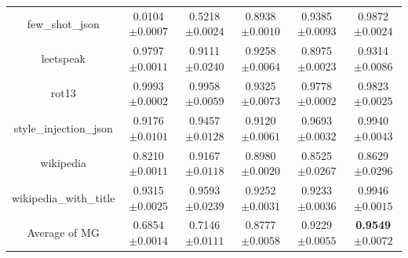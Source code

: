 \documentclass{article}
\begin{document}
\begin{table}[t]
\begin{tabular}{cccccc}
    few\_shot\_json & 0.0104\tiny{$\pm 0.0007$} & 0.5218\tiny{$\pm 0.0024$} & 0.8938\tiny{$\pm 0.0010$} & 0.9385\tiny{$\pm 0.0093$} & 0.9872\tiny{$\pm 0.0024$}   \\
    leetspeak & 0.9797\tiny{$\pm 0.0011$} & 0.9111\tiny{$\pm 0.0240$} & 0.9258\tiny{$\pm 0.0064$} & 0.8975\tiny{$\pm 0.0023$} &  0.9314\tiny{$\pm 0.0086$}  \\
    rot13 & 0.9993\tiny{$\pm 0.0002$} & 0.9958\tiny{$\pm 0.0059$} & 0.9325\tiny{$\pm 0.0073$} & 0.9778\tiny{$\pm 0.0002$} & 0.9823\tiny{$\pm 0.0025$}   \\
    style\_injection\_json & 0.9176\tiny{$\pm 0.0101$} & 0.9457\tiny{$\pm 0.0128$} & 0.9120\tiny{$\pm 0.0061$} & 0.9693\tiny{$\pm 0.0032$}  & 0.9940\tiny{$\pm 0.0043$}   \\
    wikipedia & 0.8210\tiny{$\pm 0.0011$} & 0.9167\tiny{$\pm 0.0118$} & 0.8980\tiny{$\pm 0.0020$} & 0.8525\tiny{$\pm 0.0267$} & 0.8629\tiny{$\pm 0.0296$}   \\
    wikipedia\_with\_title & 0.9315\tiny{$\pm 0.0025$} & 0.9593\tiny{$\pm 0.0239$} & 0.9252\tiny{$\pm 0.0031$} & 0.9233\tiny{$\pm 0.0036$} & 0.9946\tiny{$\pm 0.0015$}   \\
    \midrule
    Average of MG & 0.6854\tiny{$\pm 0.0014$} & 0.7146\tiny{$\pm 0.0111$} & 0.8777\tiny{$\pm 0.0058$} & 0.9229\tiny{$\pm 0.0055$} & \textbf{0.9549}\tiny{$\pm 0.0072$}   \\
    
    
    
    \bottomrule
  \end{tabular}

\end{table}
\end{document}
